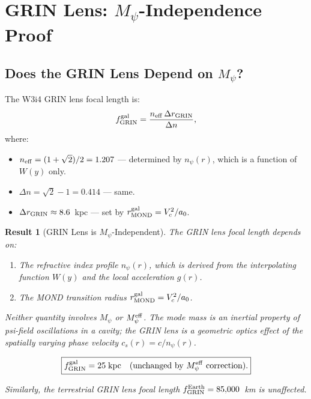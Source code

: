 \documentclass[aps,prd,twocolumn,superscriptaddress,nofootinbib]{revtex4-2}
\newcommand{\npsi}{n_\psi}
\newcommand{\Mpsi}{M_\psi}
\newcommand{\Meff}{M_\psi^{\rm eff}}
\newtheorem{result}{Result}
\begin{document}
\section{GRIN Lens: $\Mpsi$-Independence Proof}
\label{sec:GRIN}

\subsection{Does the GRIN Lens Depend on $\Mpsi$?}

The W3i4 GRIN lens focal length is:
\begin{equation}
f_{\rm GRIN}^{\rm gal} = \frac{n_{\rm eff}\,\Delta r_{\rm GRIN}}{\Delta n},
\label{eq:GRIN_focal}
\end{equation}
where:
\begin{itemize}
\item $n_{\rm eff} = (1 + \sqrt{2})/2 = 1.207$ --- determined by
  $\npsi(r)$, which is a function of $W(y)$ only.
\item $\Delta n = \sqrt{2} - 1 = 0.414$ --- same.
\item $\Delta r_{\rm GRIN} \approx 8.6$~kpc --- set by
  $r_{\rm MOND}^{\rm gal} = V_c^2/a_0$.
\end{itemize}

\begin{result}[GRIN Lens is $\Mpsi$-Independent]
\label{res:GRIN}
The GRIN lens focal length depends on:
\begin{enumerate}
\item The refractive index profile $\npsi(r)$, which is derived from
  the interpolating function $W(y)$ and the local acceleration $g(r)$.
\item The MOND transition radius $r_{\rm MOND}^{\rm gal} = V_c^2/a_0$.
\end{enumerate}

Neither quantity involves $\Mpsi$ or $\Meff$. The mode mass is an
inertial property of psi-field oscillations in a cavity; the GRIN
lens is a geometric optics effect of the spatially varying phase
velocity $c_s(r) = c/\npsi(r)$.

\begin{equation}
\boxed{f_{\rm GRIN}^{\rm gal} = 25\;\text{kpc}
\quad\text{(unchanged by $\Meff$ correction).}}
\end{equation}

Similarly, the terrestrial GRIN lens focal length
$f_{\rm GRIN}^{\rm Earth} = 85{,}000$~km is unaffected.
\end{result}
\end{document}
